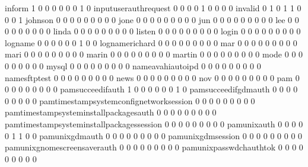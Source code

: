 \documentclass[compress,8pt]{beamer}
\begin{document}
\begin{frame}
\begin{Schunk}
  inform                                     1   0   0   0   0   0   0   1   0
  inputuserauthrequest                       0   0   0   0   1   0   0   0   0
  invalid                                    0   1   0   1   1   0   0   0   1
  johnson                                    0   0   0   0   0   0   0   0   0
  jone                                       0   0   0   0   0   0   0   0   0
  jun                                        0   0   0   0   0   0   0   0   0
  lee                                        0   0   0   0   0   0   0   0   0
  linda                                      0   0   0   0   0   0   0   0   0
  listen                                     0   0   0   0   0   0   0   0   0
  login                                      0   0   0   0   0   0   0   0   0
  logname                                    0   0   0   0   0   0   1   0   0
  lognamerichard                             0   0   0   0   0   0   0   0   0
  mar                                        0   0   0   0   0   0   0   0   0
  mari                                       0   0   0   0   0   0   0   0   0
  marin                                      0   0   0   0   0   0   0   0   0
  martin                                     0   0   0   0   0   0   0   0   0
  mode                                       0   0   0   0   0   0   0   0   0
  mysql                                      0   0   0   0   0   0   0   0   0
  nameavahiautoipd                           0   0   0   0   0   0   0   0   0
  namesftptest                               0   0   0   0   0   0   0   0   0
  news                                       0   0   0   0   0   0   0   0   0
  nov                                        0   0   0   0   0   0   0   0   0
  pam                                        0   0   0   0   0   0   0   0   0
  pamsucceedifauth                           1   0   0   0   0   0   0   1   0
  pamsucceedifgdmauth                        0   0   0   0   0   0   0   0   0
  pamtimestampsystemconfignetworksession     0   0   0   0   0   0   0   0   0
  pamtimestampsysteminstallpackagesauth      0   0   0   0   0   0   0   0   0
  pamtimestampsysteminstallpackagessession   0   0   0   0   0   0   0   0   0
  pamunixauth                                0   0   0   0   0   1   1   0   0
  pamunixgdmauth                             0   0   0   0   0   0   0   0   0
  pamunixgdmsession                          0   0   0   0   0   0   0   0   0
  pamunixgnomescreensaverauth                0   0   0   0   0   0   0   0   0
  pamunixpasswdchauthtok                     0   0   0   0   0   0   0   0   0

\end{Schunk}
\end{frame}
\end{document}
